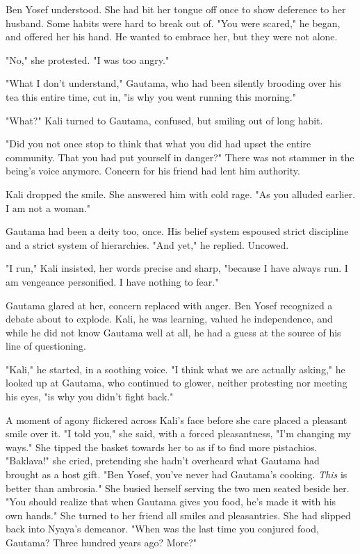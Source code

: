 \documentclass{amsart}
\begin{document}
Ben Yosef understood. She had bit her tongue off once to show deference to her husband. Some habits were hard to break out of. "You were scared," he began, and offered her his hand. He wanted to embrace her, but they were not alone.

"No," she protested. "I was too angry." 

"What I don't understand," Gautama, who had been silently brooding over his tea this entire time, cut in, "is why you went running this morning." 

"What?" Kali turned to Gautama, confused, but smiling out of long habit. 

"Did you not once stop to think that what you did had upset the entire community. That you had put yourself in danger?" There was not stammer in the being's voice anymore. Concern for his friend had lent him authority.

Kali dropped the smile. She answered him with cold rage. "As you alluded earlier. I am not a woman."

Gautama had been a deity too, once. His belief system espoused strict discipline and a strict system of hierarchies. "And yet," he replied. Uncowed.

"I run," Kali insisted, her words precise and sharp, "because I have always run. I am vengeance personified. I have nothing to fear."

Gautama glared at her, concern replaced with anger. Ben Yosef recognized a debate about to explode. Kali, he was learning, valued he independence, and while he did not know Gautama well at all, he had a guess at the source of his line of questioning. 

"Kali," he started, in a soothing voice. "I think what we are actually asking," he looked up at Gautama, who continued to glower, neither protesting nor meeting his eyes, "is why you didn't fight back."

A moment of agony flickered across Kali's face before she care placed a pleasant smile over it. "I told you," she said, with a forced pleasantness, "I'm changing my ways." She tipped the basket towards her to as if to find more pistachios. "Baklava!" she cried, pretending she hadn't overheard what Gautama had brought as a host gift. "Ben Yosef, you've never had Gautama's cooking. \emph{This} is better than ambrosia." She busied herself serving the two men seated beside her. "You should realize that when Gautama gives you food, he's made it with his own hands." She turned to her friend all smiles and pleasantries. She had slipped back into Nyaya's demeanor. "When was the last time you conjured food, Gautama? Three hundred years ago? More?"
\end{document}
